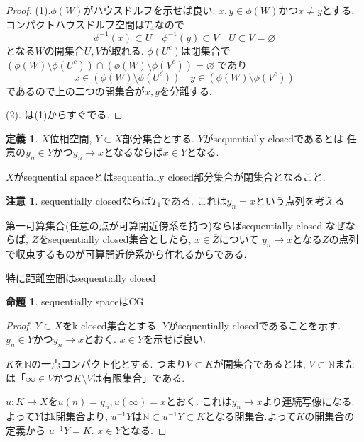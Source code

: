 \documentclass[dvipdfmx,a4paper,11pt]{article}
\newcommand{\N}{\mathbb{N}}
\theoremstyle{definition}
\newtheorem{prop}[thm]{命題}
\newtheorem{dfn}[thm]{定義}
\newtheorem{rem}[thm]{注意}
\begin{document}
\begin{proof}
(1).$\phi(W)$がハウスドルフを示せば良い.
$x,y \in \phi(W)$かつ$x \neq y$とする.
コンパクトハウスドルフ空間は$T_4$なので
$$
\phi^{-1}(x) \subset U\quad
\phi^{-1}(y) \subset V\quad
U \subset V = \varnothing
$$
となる$W$の開集合$U,V$が取れる. 
$\phi(U^{c})$は閉集合で
$\left( \phi(W) \setminus \phi(U^c) \right) \cap \left( \phi(W) \setminus \phi(V^c) \right) = \varnothing$
であり
$$
x \in \left( \phi(W) \setminus \phi(U^c) \right) \quad
y \in \left( \phi(W) \setminus \phi(V^c) \right) 
$$
であるので上の二つの開集合が$x,y$を分離する.

(2). は(1)からすぐでる.
\end{proof}

 \begin{tcolorbox}
 [colback = white, colframe = green!35!black, fonttitle = \bfseries,breakable = true]
\begin{dfn}\cite{Str}
$X$位相空間, $Y \subset X$部分集合とする.
$Y$がsequentially closedであるとは
任意の$y_n \in Y$かつ$y_n \to x$となるならば$x \in Y$となる.

$X$がsequential spaceとはsequentially closed部分集合が閉集合となること. 
\end{dfn}
\end{tcolorbox}
\begin{rem}
sequentially closedならば$T_1$である. これは$y_n =x$という点列を考える

第一可算集合(任意の点が可算開近傍系を持つ)ならばsequentially closed
なぜならば, $Z$をsequentially closed集合としたら, $x \in \overline{Z}$について
$y_n \to x$となる$Z$の点列で収束するものが可算開近傍系から作れるからである.

特に距離空間はsequentially closed
\end{rem}

 \begin{tcolorbox}
 [colback = white, colframe = green!35!black, fonttitle = \bfseries,breakable = true]
\begin{prop}\cite[Prop 1.6]{Str}
sequentially spaceはCG
\end{prop}
\end{tcolorbox}
\begin{proof}
$Y \subset X$をk-closed集合とする.
$Y$がsequentially closedであることを示す.
$y_n \in Y$かつ$y_n \to x$とおく. $x \in Y$を示せば良い.

$K$を$\N$の一点コンパクト化とする.
つまり$V \subset K$が開集合であるとは, $V \subset \N$または「$\infty \in V$かつ$K \setminus V$は有限集合」である. 

$u : K \to X$を$u(n)=y_n, u(\infty)=x$とおく. 
これは$y_n \to x$より連続写像になる. 
よって$Y$はk閉集合より, $u^{-1}Y$は$\N \subset u^{-1}Y\subset K$となる閉集合.よって$K$の開集合の定義から $u^{-1}Y = K$. $x \in Y$となる. 

\end{proof}
\end{document}
